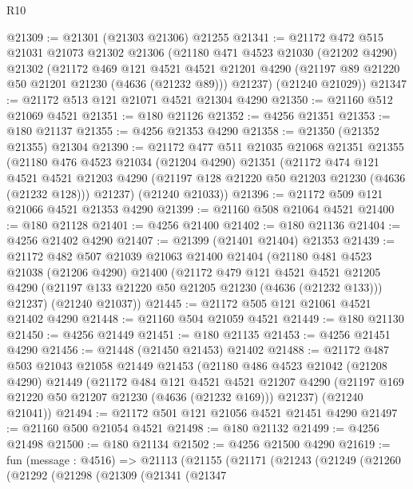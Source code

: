 \begin{lexlean}{R10}
\begin{coremodule}
@21309 := @21301 (@21303 @21306) @21255
@21341 := @21172
    @472
    @515
    @21031
    @21073
    @21302
    @21306
    (@21180
      @471
      @4523
      @21030
      (@21202 @4290)
      @21302
      (@21172
        @469
        @121
        @4521
        @4521
        @21201
        @4290
        (@21197 @89 @21220 @50 @21201 @21230 (@4636 (@21232 @89)))
        @21237)
      (@21240 @21029))
@21347 := @21172 @513 @121 @21071 @4521 @21304 @4290
@21350 := @21160 @512 @21069 @4521
@21351 := @180 @21126
@21352 := @4256 @21351
@21353 := @180 @21137
@21355 := @4256 @21353 @4290
@21358 := @21350 (@21352 @21355) @21304
@21390 := @21172
    @477
    @511
    @21035
    @21068
    @21351
    @21355
    (@21180
      @476
      @4523
      @21034
      (@21204 @4290)
      @21351
      (@21172
        @474
        @121
        @4521
        @4521
        @21203
        @4290
        (@21197 @128 @21220 @50 @21203 @21230 (@4636 (@21232 @128)))
        @21237)
      (@21240 @21033))
@21396 := @21172 @509 @121 @21066 @4521 @21353 @4290
@21399 := @21160 @508 @21064 @4521
@21400 := @180 @21128
@21401 := @4256 @21400
@21402 := @180 @21136
@21404 := @4256 @21402 @4290
@21407 := @21399 (@21401 @21404) @21353
@21439 := @21172
    @482
    @507
    @21039
    @21063
    @21400
    @21404
    (@21180
      @481
      @4523
      @21038
      (@21206 @4290)
      @21400
      (@21172
        @479
        @121
        @4521
        @4521
        @21205
        @4290
        (@21197 @133 @21220 @50 @21205 @21230 (@4636 (@21232 @133)))
        @21237)
      (@21240 @21037))
@21445 := @21172 @505 @121 @21061 @4521 @21402 @4290
@21448 := @21160 @504 @21059 @4521
@21449 := @180 @21130
@21450 := @4256 @21449
@21451 := @180 @21135
@21453 := @4256 @21451 @4290
@21456 := @21448 (@21450 @21453) @21402
@21488 := @21172
    @487
    @503
    @21043
    @21058
    @21449
    @21453
    (@21180
      @486
      @4523
      @21042
      (@21208 @4290)
      @21449
      (@21172
        @484
        @121
        @4521
        @4521
        @21207
        @4290
        (@21197 @169 @21220 @50 @21207 @21230 (@4636 (@21232 @169)))
        @21237)
      (@21240 @21041))
@21494 := @21172 @501 @121 @21056 @4521 @21451 @4290
@21497 := @21160 @500 @21054 @4521
@21498 := @180 @21132
@21499 := @4256 @21498
@21500 := @180 @21134
@21502 := @4256 @21500 @4290
@21619 := fun (message : @4516) =>
  @21113
    (@21155
      (@21171
        (@21243
          (@21249
            (@21260
              (@21292
                (@21298
                  (@21309
                    (@21341
                      (@21347

\end{coremodule}
\end{lexlean}
